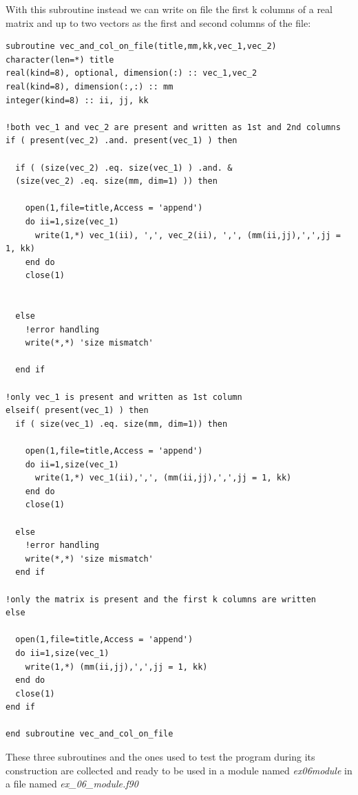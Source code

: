 \documentclass[prb,9pt,notitlepage]{revtex4-1}
\begin{document}
With this subroutine instead we can write on file the first k columns of a real matrix and up to two vectors as the first and second columns of the file:
\begin{lstlisting}
subroutine vec_and_col_on_file(title,mm,kk,vec_1,vec_2)
character(len=*) title
real(kind=8), optional, dimension(:) :: vec_1,vec_2
real(kind=8), dimension(:,:) :: mm
integer(kind=8) :: ii, jj, kk

!both vec_1 and vec_2 are present and written as 1st and 2nd columns
if ( present(vec_2) .and. present(vec_1) ) then

  if ( (size(vec_2) .eq. size(vec_1) ) .and. &
  (size(vec_2) .eq. size(mm, dim=1) )) then

    open(1,file=title,Access = 'append')
    do ii=1,size(vec_1)
      write(1,*) vec_1(ii), ',', vec_2(ii), ',', (mm(ii,jj),',',jj = 1, kk)
    end do
    close(1)


  else
    !error handling
    write(*,*) 'size mismatch'

  end if

!only vec_1 is present and written as 1st column
elseif( present(vec_1) ) then
  if ( size(vec_1) .eq. size(mm, dim=1)) then

    open(1,file=title,Access = 'append')
    do ii=1,size(vec_1)
      write(1,*) vec_1(ii),',', (mm(ii,jj),',',jj = 1, kk)
    end do
    close(1)

  else
    !error handling
    write(*,*) 'size mismatch'
  end if

!only the matrix is present and the first k columns are written
else

  open(1,file=title,Access = 'append')
  do ii=1,size(vec_1)
    write(1,*) (mm(ii,jj),',',jj = 1, kk)
  end do
  close(1)
end if

end subroutine vec_and_col_on_file
\end{lstlisting}
These three subroutines and the ones used to test the program during its construction are collected and ready to be used in a module named \textit{ex06module} in a file named \textit{ex\_06\_module.f90}
\end{document}
